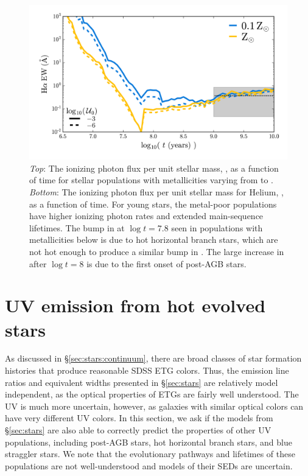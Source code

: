 \begin{figure}
  \begin{center}
    \includegraphics[width=\linewidth]{figs/f4.png}
    \caption{\emph{Top}: The ionizing photon flux per unit stellar mass, \QH, as a function of time for stellar populations with metallicities varying from  to . \emph{Bottom}: The ionizing photon flux per unit stellar mass for Helium, \QHe, as a function of time. For young stars, the metal-poor populations have higher ionizing photon rates and extended main-sequence lifetimes. The bump in \QH at $\log t = 7.8$ seen in populations with metallicities below  is due to hot horizontal branch stars, which are not hot enough to produce a similar bump in \QHe. The large increase in \QHe after $\log t = 8$ is due to the first onset of post-AGB stars.}
    \label{fig:popQs}
  \end{center}
\end{figure}

\section{UV emission from hot evolved stars}\label{sec:colors}

As discussed in \S\ref{sec:stars:continuum}, there are broad classes of star formation histories that produce reasonable SDSS ETG colors. Thus, the emission line ratios and equivalent widths presented in \S\ref{sec:stars} are relatively model independent, as the optical properties of ETGs are fairly well understood. The UV is much more uncertain, however, as galaxies with similar optical colors can have very different UV colors. In this section, we ask if the models from \S\ref{sec:stars} are also able to correctly predict the properties of other UV populations, including post-AGB stars, hot horizontal branch stars, and blue straggler stars. We note that the evolutionary pathways and lifetimes of these populations are not well-understood and models of their SEDs are uncertain.

